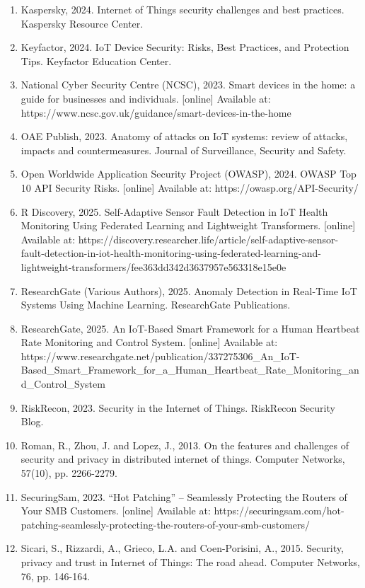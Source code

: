 \begin{enumerate}
  \item Kaspersky, 2024. Internet of Things security challenges and best practices. Kaspersky Resource Center.
  \item Keyfactor, 2024. IoT Device Security: Risks, Best Practices, and Protection Tips. Keyfactor Education Center.
  \item National Cyber Security Centre (NCSC), 2023. Smart devices in the home: a guide for businesses and individuals. [online] Available at: https://www.ncsc.gov.uk/guidance/smart-devices-in-the-home
  \item OAE Publish, 2023. Anatomy of attacks on IoT systems: review of attacks, impacts and countermeasures. Journal of Surveillance, Security and Safety.
  \item Open Worldwide Application Security Project (OWASP), 2024. OWASP Top 10 API Security Risks. [online] Available at: https://owasp.org/API-Security/
  \item R Discovery, 2025. Self-Adaptive Sensor Fault Detection in IoT Health Monitoring Using Federated Learning and Lightweight Transformers. [online] Available at: https://discovery.researcher.life/article/self-adaptive-sensor-fault-detection-in-iot-health-monitoring-using-federated-learning-and-lightweight-transformers/fee363dd342d3637957e563318e15e0e
  \item ResearchGate (Various Authors), 2025. Anomaly Detection in Real-Time IoT Systems Using Machine Learning. ResearchGate Publications.
  \item ResearchGate, 2025. An IoT-Based Smart Framework for a Human Heartbeat Rate Monitoring and Control System. [online] Available at: https://www.researchgate.net/publication/337275306\_An\_IoT-Based\_Smart\_Framework\_for\_a\_Human\_Heartbeat\_Rate\_Monitoring\_and\_Control\_System
  \item RiskRecon, 2023. Security in the Internet of Things. RiskRecon Security Blog.
  \item Roman, R., Zhou, J. and Lopez, J., 2013. On the features and challenges of security and privacy in distributed internet of things. Computer Networks, 57(10), pp. 2266-2279.
  \item SecuringSam, 2023. ``Hot Patching'' -- Seamlessly Protecting the Routers of Your SMB Customers. [online] Available at: https://securingsam.com/hot-patching-seamlessly-protecting-the-routers-of-your-smb-customers/
  \item Sicari, S., Rizzardi, A., Grieco, L.A. and Coen-Porisini, A., 2015. Security, privacy and trust in Internet of Things: The road ahead. Computer Networks, 76, pp. 146-164.

\end{enumerate}
